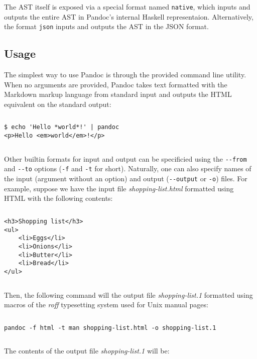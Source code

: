 \documentclass[
  digital,     %
  oneside,     %
  nosansbold,  %
  nocolorbold, %
  lof,         %
  lot,         %
]{fithesis4}
\begin{document}
The AST itself is exposed via a special format named \texttt{native}, which inputs and outputs the entire AST in Pandoc's internal Haskell representaion. Alternatively, the format \texttt{json} inputs and outputs the AST in the JSON format.

\subsection{Usage}

The simplest way to use Pandoc is through the provided command line utility. When no arguments are provided, Pandoc takes text formatted with the Markdown markup language from standard input and outputs the HTML equivalent on the standard output:

$ $

\noindent
\begin{lstlisting}
$ echo 'Hello *world*!' | pandoc
<p>Hello <em>world</em>!</p>
\end{lstlisting}

$ $

Other builtin formats for input and output can be specificied using the \texttt{-{}-from} and \texttt{-{}-to} options (\texttt{-f} and \texttt{-t} for short). Naturally, one can also specify names of the input (argument without an option) and output (\texttt{-{}-output} or \texttt{-o}) files. For example, suppose we have the input file \textit{shopping-list.html} formatted using HTML with the following contents:

$ $

\noindent
\lstset{language=HTML}
\begin{lstlisting}
<h3>Shopping list</h3>
<ul>
    <li>Eggs</li>
    <li>Onions</li>
    <li>Butter</li>
    <li>Bread</li>
</ul>
\end{lstlisting}

$ $

\noindent
Then, the following command will the output file \textit{shopping-list.1} formatted using macros of the \textit{roff} typesetting system used for Unix manual pages:

$ $

\noindent
\lstset{language=}
\begin{lstlisting}
pandoc -f html -t man shopping-list.html -o shopping-list.1
\end{lstlisting}

$ $

\noindent
The contents of the output file \textit{shopping-list.1} will be:
\end{document}
